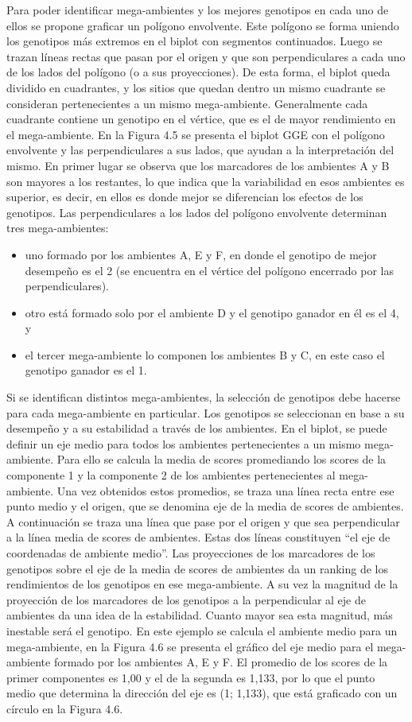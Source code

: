 Para poder identificar mega-ambientes y los mejores genotipos en cada uno de ellos se propone graficar un polígono envolvente. Este polígono se forma uniendo los genotipos más extremos en el biplot con segmentos continuados. Luego se trazan líneas rectas que pasan por el origen y que son perpendiculares a cada uno de los lados del polígono (o a sus proyecciones). De esta forma, el biplot queda dividido en cuadrantes, y los sitios que quedan dentro un mismo cuadrante se consideran pertenecientes a un mismo mega-ambiente. Generalmente cada cuadrante contiene un genotipo en el vértice, que es el de mayor rendimiento en el mega-ambiente.
En la Figura 4.5 se presenta el biplot GGE con el polígono envolvente y las perpendiculares a sus lados, que ayudan a la interpretación del mismo.
En primer lugar se observa que los marcadores de los ambientes A y B son mayores a los restantes, lo que indica que la variabilidad en esos ambientes es superior, es decir, en ellos es donde mejor se diferencian los efectos de los genotipos.
Las perpendiculares a los lados del polígono envolvente determinan tres mega-ambientes:
\begin{itemize}
\item uno formado por los ambientes A, E y F, en donde el genotipo de mejor desempeño es el 2 (se
encuentra en el vértice del polígono encerrado por las perpendiculares).
\item otro está formado solo por el ambiente D y el genotipo ganador en él es el 4, y
\item  el tercer mega-ambiente lo componen los ambientes B y C, en este caso el genotipo ganador es el 1.
\end{itemize}

Si se identifican distintos mega-ambientes, la selección de genotipos debe hacerse para cada mega-ambiente en particular. Los genotipos se seleccionan en base a su desempeño y a su estabilidad a través de los ambientes.
En el biplot, se puede definir un eje medio para todos los ambientes pertenecientes a un mismo mega-ambiente. Para ello se calcula la media de scores promediando los scores de la componente 1 y la componente 2 de los ambientes pertenecientes al mega-ambiente. Una vez obtenidos estos promedios, se traza una línea recta entre ese punto medio y el origen, que se denomina eje de la media de scores de ambientes. A continuación se traza una línea que pase por el origen y que sea perpendicular a la línea
media de scores de ambientes. Estas dos líneas constituyen ``el eje de coordenadas de ambiente medio''.
Las proyecciones de los marcadores de los genotipos sobre el eje de la media de scores de ambientes da un ranking de los rendimientos de los genotipos en ese mega-ambiente. A su vez la magnitud de la proyección de los marcadores de los genotipos a la perpendicular al eje de ambientes da una idea de la estabilidad. Cuanto mayor sea esta magnitud, más inestable será el genotipo.
En este ejemplo se calcula el ambiente medio para un mega-ambiente, en la Figura 4.6 se presenta el gráfico del eje medio para el mega-ambiente formado por los ambientes A, E y F. El promedio de los scores de la primer componentes es 1,00 y el de la segunda es 1,133, por lo que el punto medio que determina la dirección del eje es (1; 1,133), que está graficado con un círculo en la Figura 4.6.

